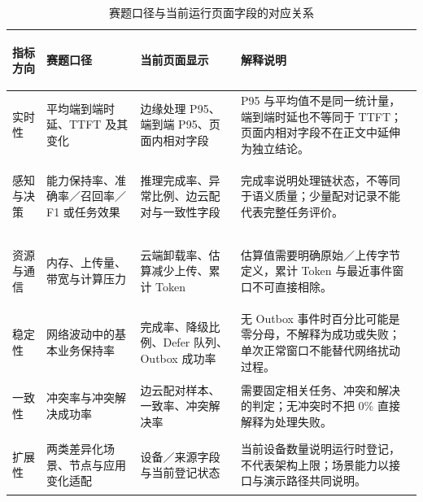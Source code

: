 \begin{table}[htbp]
  \centering
  \footnotesize
  \caption{赛题口径与当前运行页面字段的对应关系}
  \label{tab:metric-interpretation}
  \begin{tabularx}{\textwidth}{>{\bfseries\raggedright\arraybackslash}p{} p{} p{} X}
    \toprule
    指标方向 & 赛题口径 & 当前页面显示 & 解释说明 \\
    \midrule
    实时性 & 平均端到端时延、TTFT 及其变化 & 边缘处理 P95、端到端 P95、页面内相对字段 & P95 与平均值不是同一统计量，端到端时延也不等同于 TTFT；页面内相对字段不在正文中延伸为独立结论。 \\
    感知与决策 & 能力保持率、准确率／召回率／F1 或任务效果 & 推理完成率、异常比例、边云配对与一致性字段 & 完成率说明处理链状态，不等同于语义质量；少量配对记录不能代表完整任务评价。 \\
    资源与通信 & 内存、上传量、带宽与计算压力 & 云端卸载率、估算减少上传、累计 Token & 估算值需要明确原始／上传字节定义，累计 Token 与最近事件窗口不可直接相除。 \\
    稳定性 & 网络波动中的基本业务保持率 & 完成率、降级比例、Defer 队列、Outbox 成功率 & 无 Outbox 事件时百分比可能是零分母，不解释为成功或失败；单次正常窗口不能替代网络扰动过程。 \\
    一致性 & 冲突率与冲突解决成功率 & 边云配对样本、一致率、冲突解决率 & 需要固定相关任务、冲突和解决的判定；无冲突时不把 0\% 直接解释为处理失败。 \\
    扩展性 & 两类差异化场景、节点与应用变化适配 & 设备／来源字段与当前登记状态 & 当前设备数量说明运行时登记，不代表架构上限；场景能力以接口与演示路径共同说明。 \\
    \bottomrule
  \end{tabularx}
\end{table}
